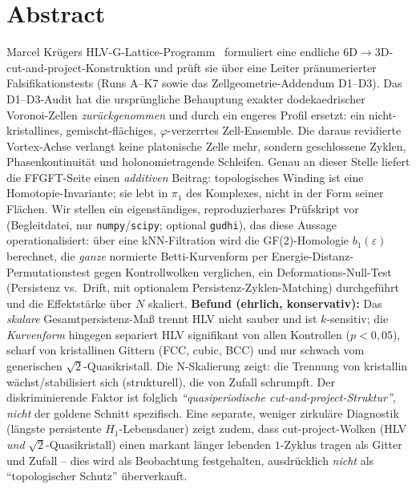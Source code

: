 
\newtheorem*{beobachtung*}{Beobachtung}

\section*{Abstract}
Marcel Krügers HLV-G-Lattice-Programm~\cite{krueger276main} formuliert eine
endliche 6D$\to$3D-cut-and-project-Konstruktion und prüft sie über eine
Leiter pränumerierter Falsifikationstests (Runs A--K7 sowie das
Zell\-geometrie-Addendum D1--D3). Das D1--D3-Audit hat die ursprüngliche
Behauptung exakter dodekaedrischer Voronoi-Zellen \emph{zurückgenommen} und
durch ein engeres Profil ersetzt: ein nicht-kristallines, gemischt-flächiges,
$\varphi$-verzerrtes Zell-Ensemble. Die daraus revidierte Vortex-Achse
verlangt keine platonische Zelle mehr, sondern geschlossene Zyklen,
Phasen\-kontinuität und holonomietragende Schleifen. Genau an dieser Stelle
liefert die FFGFT-Seite einen \emph{additiven} Beitrag: topologisches Winding
ist eine Homotopie-Invariante; sie lebt in $\pi_1$ des Komplexes, nicht in der
Form seiner Flächen. Wir stellen ein eigenständiges, reproduzierbares
Prüf\-skript vor (Begleitdatei, nur \texttt{numpy}/\texttt{scipy}; optional
\texttt{gudhi}), das diese Aussage operationalisiert: über eine
kNN-Filtration wird die GF(2)-Homologie $b_1(\varepsilon)$ berechnet, die
\emph{ganze} normierte Betti-Kurvenform per Energie-Distanz-Permutationstest
gegen Kontrollwolken verglichen, ein Deformations-Null-Test (Persistenz vs.\
Drift, mit optionalem Persistenz-Zyklen-Matching) durchgeführt und die
Effektstärke über $N$ skaliert. \textbf{Befund (ehrlich, konservativ):} Das
\emph{skalare} Gesamtpersistenz-Maß trennt HLV nicht sauber und ist
$k$-sensitiv; die \emph{Kurvenform} hingegen separiert HLV signifikant von
allen Kontrollen ($p<0{,}05$), scharf von kristallinen Gittern (FCC, cubic,
BCC) und nur schwach vom generischen $\sqrt{2}$-Quasikristall. Die
N-Skalierung zeigt: die Trennung von kristallin wächst/stabilisiert sich
(strukturell), die von Zufall schrumpft. Der diskriminierende Faktor ist
folglich \emph{``quasiperiodische cut-and-project-Struktur''}, \emph{nicht}
der goldene Schnitt spezifisch. Eine separate, weniger zirkuläre Diagnostik
(längste persistente $H_1$-Lebensdauer) zeigt zudem, dass cut-project-Wolken
(HLV \emph{und} $\sqrt{2}$-Quasikristall) einen markant länger lebenden
$1$-Zyklus tragen als Gitter und Zufall -- dies wird als Beobachtung
festgehalten, ausdrücklich \emph{nicht} als ``topologischer Schutz''
überverkauft.

